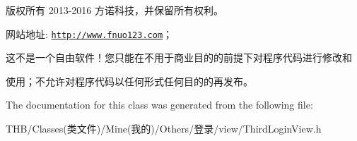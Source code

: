 版权所有 2013-\/2016 方诺科技，并保留所有权利。

网站地址\+: \href{http://www.fnuo123.com}{\tt http\+://www.\+fnuo123.\+com}； 



这不是一个自由软件！您只能在不用于商业目的的前提下对程序代码进行修改和

使用；不允许对程序代码以任何形式任何目的的再发布。 

 

The documentation for this class was generated from the following file\+:\begin{DoxyCompactItemize}
\item 
T\+H\+B/\+Classes(类文件)/\+Mine(我的)/\+Others/登录/view/Third\+Login\+View.\+h\end{DoxyCompactItemize}
